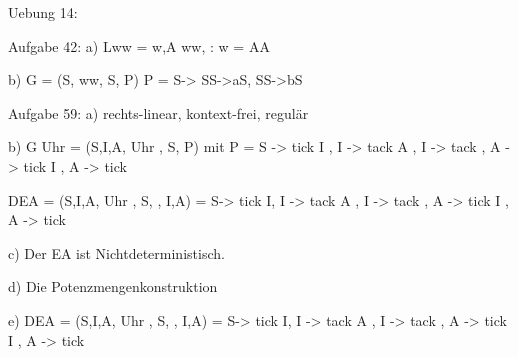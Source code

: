 Uebung 14:

Aufgabe 42:
a) Lww = {w,A \element \Sigma ww, : \forall w = AA}

b)
G = (S, \Sigma ww, S, P)
P = {
	S->\epsilon
	SS->aS,
	SS->bS
	}
	
Aufgabe 59:
a)
rechts-linear, kontext-frei, regulär

b)
G Uhr = ({S,I,A},  \Sigma Uhr , S, P) mit
P = {  S -> tick I  ,
		I -> tack A  , 
		I -> tack  ,
		A -> tick I  , 
		A -> tick  }

DEA = ({S,I,A},  \Sigma Uhr , S, \delta, {I,A})
\delta = {
	S-> tick I,
	I -> tack A  , 
	I -> tack  ,
	A -> tick I  , 
	A -> tick
}

c) Der EA ist Nichtdeterministisch.

d) Die Potenzmengenkonstruktion

e)
DEA = ({S,I,A},  \Sigma Uhr , S, \delta, {I,A})
\delta = {
	S-> tick I,
	I -> tack A  , 
	I -> tack  ,
	A -> tick I  , 
	A -> tick
}